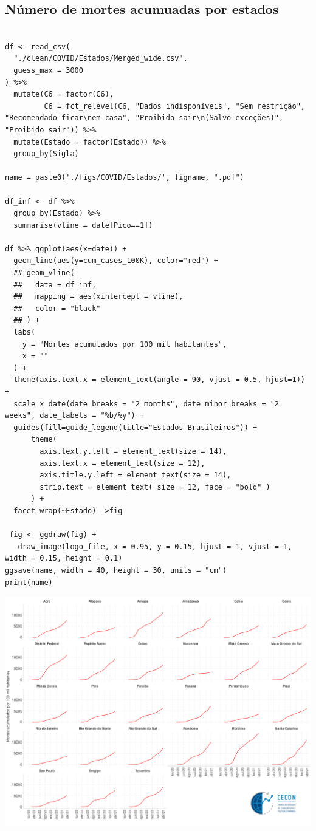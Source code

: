 \documentclass{SelfArx}
\begin{document}
\subsection*{Número de mortes acumuadas por estados}
\label{sec:orga131dd7}

\begin{verbatim}

df <- read_csv(
  "./clean/COVID/Estados/Merged_wide.csv",
  guess_max = 3000
) %>%
  mutate(C6 = factor(C6),
         C6 = fct_relevel(C6, "Dados indisponíveis", "Sem restrição", "Recomendado ficar\nem casa", "Proibido sair\n(Salvo exceções)", "Proibido sair")) %>%
  mutate(Estado = factor(Estado)) %>%
  group_by(Sigla)

name = paste0('./figs/COVID/Estados/', figname, ".pdf")

df_inf <- df %>%
  group_by(Estado) %>%
  summarise(vline = date[Pico==1])

df %>% ggplot(aes(x=date)) +
  geom_line(aes(y=cum_cases_100K), color="red") +
  ## geom_vline(
  ##   data = df_inf,
  ##   mapping = aes(xintercept = vline),
  ##   color = "black"
  ## ) +
  labs(
    y = "Mortes acumulados por 100 mil habitantes",
    x = ""
  ) +
  theme(axis.text.x = element_text(angle = 90, vjust = 0.5, hjust=1)) +
  scale_x_date(date_breaks = "2 months", date_minor_breaks = "2 weeks", date_labels = "%b/%y") +
  guides(fill=guide_legend(title="Estados Brasileiros")) +
      theme(
        axis.text.y.left = element_text(size = 14),
        axis.text.x = element_text(size = 12),
        axis.title.y.left = element_text(size = 14),
        strip.text = element_text( size = 12, face = "bold" )
      ) +
  facet_wrap(~Estado) ->fig

 fig <- ggdraw(fig) +
   draw_image(logo_file, x = 0.95, y = 0.15, hjust = 1, vjust = 1, width = 0.15, height = 0.1)
ggsave(name, width = 40, height = 30, units = "cm")
print(name)
\end{verbatim}

\begin{center}
\includegraphics[width=.9\linewidth]{./figs/COVID/Estados/Mortes_Cum.pdf}
\end{center}
\end{document}
